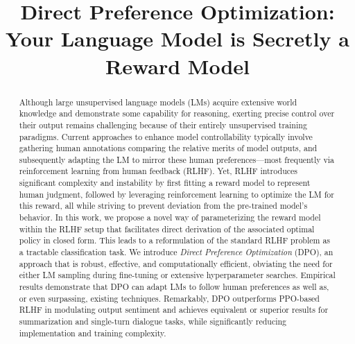 \title{Direct Preference Optimization: Your Language Model is Secretly a Reward Model}

\begin{abstract}
Although large unsupervised language models (LMs) acquire extensive world knowledge and demonstrate some capability for reasoning, exerting precise control over their output remains challenging because of their entirely unsupervised training paradigms. Current approaches to enhance model controllability typically involve gathering human annotations comparing the relative merits of model outputs, and subsequently adapting the LM to mirror these human preferences—most frequently via reinforcement learning from human feedback (RLHF). Yet, RLHF introduces significant complexity and instability by first fitting a reward model to represent human judgment, followed by leveraging reinforcement learning to optimize the LM for this reward, all while striving to prevent deviation from the pre-trained model’s behavior. In this work, we propose a novel way of parameterizing the reward model within the RLHF setup that facilitates direct derivation of the associated optimal policy in closed form. This leads to a reformulation of the standard RLHF problem as a tractable classification task. We introduce \textit{Direct Preference Optimization} (DPO), an approach that is robust, effective, and computationally efficient, obviating the need for either LM sampling during fine-tuning or extensive hyperparameter searches. Empirical results demonstrate that DPO can adapt LMs to follow human preferences as well as, or even surpassing, existing techniques. Remarkably, DPO outperforms PPO-based RLHF in modulating output sentiment and achieves equivalent or superior results for summarization and single-turn dialogue tasks, while significantly reducing implementation and training complexity.
\end{abstract}

